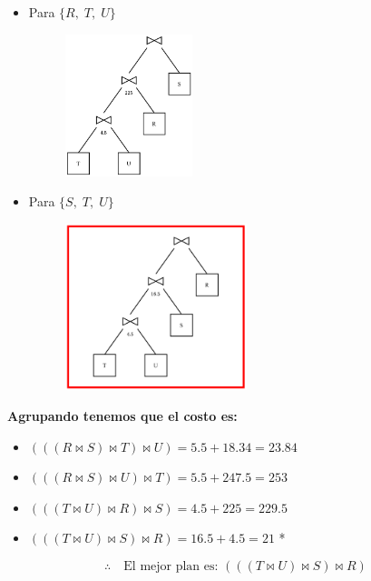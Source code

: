 \documentclass{templateNote}
\newcommand{\newparagraph}{\par\vspace{\baselineskip}\noindent}
\begin{document}
\begin{enumerate}
\begin{enumerate}[label=\arabic*)]
\begin{itemize}
            \item Para $\{R, \; T, \; U\}$
            \begin{figure}[H]
                \centering
                \includegraphics[width=0.35\textwidth]{img/E4-A3.png}
            \end{figure}

            \item Para $\{S, \; T, \; U\}$
            \begin{figure}[H]
                \centering
                \includegraphics[width=0.5\textwidth]{img/E4-A4.png}
            \end{figure}
        \end{itemize}

        \newpage
        \textbf{Agrupando tenemos que el costo es:}
        \begin{itemize}
            \item $(((R \Join S) \Join T) \Join U) = 5.5 + 18.34 = 23.84$
            \item $(((R \Join S) \Join U) \Join T) = 5.5 + 247.5 = 253$
            \item $(((T \Join U) \Join R) \Join S) = 4.5 + 225 = 229.5$
            \item $(((T \Join U) \Join S) \Join R) = 16.5 + 4.5 = 21$ *
        \end{itemize}

        \begin{equation*}
            \therefore \quad \text{El mejor plan es: } (((T \Join U) \Join S) \Join R)
        \end{equation*}
        \newparagraph


\end{enumerate}
\end{enumerate}
\end{document}
